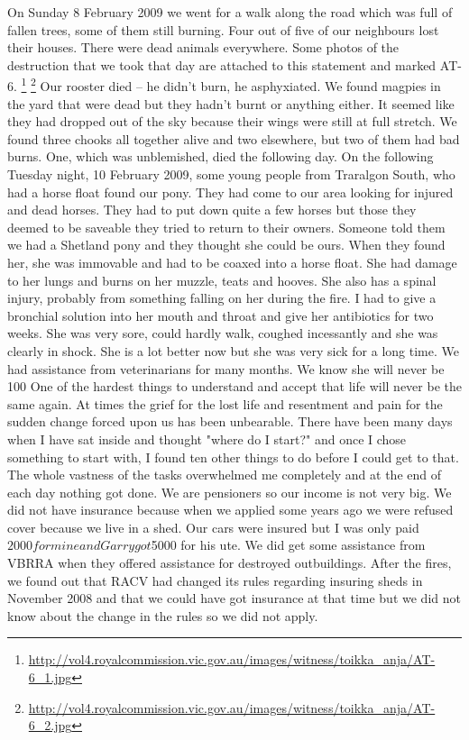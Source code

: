 \documentclass[a4paper]{article}
\begin{document}
        On Sunday 8 February 2009 we went for a walk along the road which was full of fallen trees, some of them still burning. Four out of five of our neighbours lost their houses. There were dead animals everywhere. Some photos of the destruction that we took that day are attached to this statement and marked AT-6.
        \footnote{\url{http://vol4.royalcommission.vic.gov.au/images/witness/toikka_anja/AT-6_1.jpg}}
        \footnote{\url{http://vol4.royalcommission.vic.gov.au/images/witness/toikka_anja/AT-6_2.jpg}}
        Our rooster died – he didn't burn, he asphyxiated. We found magpies in the yard that were dead but they hadn't burnt or anything either. It seemed like they had dropped out of the sky because their wings were still at full stretch. We found three chooks all together alive and two elsewhere, but two of them had bad burns. One, which was unblemished, died the following day.
        On the following Tuesday night, 10 February 2009, some young people from Traralgon South, who had a horse float found our pony. They had come to our area looking for injured and dead horses. They had to put down quite a few horses but those they deemed to be saveable they tried to return to their owners. Someone told them we had a Shetland pony and they thought she could be ours. When they found her, she was immovable and had to be coaxed into a horse float. She had damage to her lungs and burns on her muzzle, teats and hooves. She also has a spinal injury, probably from something falling on her during the fire. I had to give a bronchial solution into her mouth and throat and give her antibiotics for two weeks. She was very sore, could hardly walk, coughed incessantly and she was clearly in shock. She is a lot better now but she was very sick for a long time. We had assistance from veterinarians for many months. We know she will never be 100%
        One of the hardest things to understand and accept that life will never be the same again. At times the grief for the lost life and resentment and pain for the sudden change forced upon us has been unbearable. There have been many days when I have sat inside and thought "where do I start?" and once I chose something to start with, I found ten other things to do before I could get to that. The whole vastness of the tasks overwhelmed me completely and at the end of each day nothing got done.
        We are pensioners so our income is not very big. We did not have insurance because when we applied some years ago we were refused cover because we live in a shed. Our cars were insured but I was only paid $2000 for mine and Garry got $5000 for his ute. We did get some assistance from VBRRA when they offered assistance for destroyed outbuildings. After the fires, we found out that RACV had changed its rules regarding insuring sheds in November 2008 and that we could have got insurance at that time but we did not know about the change in the rules so we did not apply.
\end{document}
